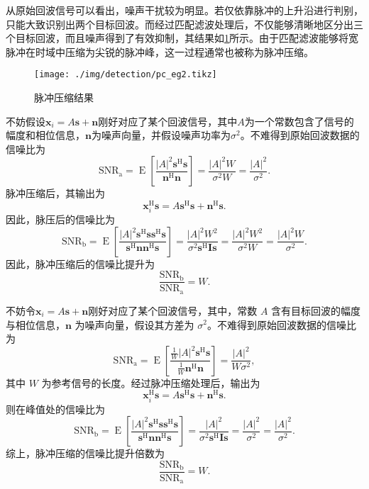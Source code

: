 \begin{solution}
    从原始回波信号可以看出，噪声干扰较为明显。若仅依靠脉冲的上升沿进行判别，只能大致识别出两个目标回波。而经过匹配滤波处理后，不仅能够清晰地区分出三个目标回波，而且噪声得到了有效抑制，其结果如\cref{fig_pc_eg2}所示。由于匹配滤波能够将宽脉冲在时域中压缩为尖锐的脉冲峰，这一过程通常也被称为脉冲压缩。
    \begin{figure}[htb!]
        \centering
        \texttt{[image: ./img/detection/pc\_eg2.tikz]}
        \caption{脉冲压缩结果}
        \label{fig_pc_eg2}
    \end{figure}
    不妨假设\( \bm{x}_i = A \bm{s} + \bm{n} \)刚好对应了某个回波信号，其中\( A \)为一个常数包含了信号的幅度和相位信息，\( \bm{n} \)为噪声向量，并假设噪声功率为\( \sigma^2 \)。不难得到原始回波数据的信噪比为
    \[
        \mathrm{SNR}_{\mathrm{a}} = \operatorname{E}\left[ \frac{|A|^2 \bm{s}^{\mathrm{H}} \bm{s}}{\bm{n}^{\mathrm{H}} \bm{n}} \right] = \frac{|A|^2 W}{\sigma^2 W} = \frac{|A|^2}{\sigma^2}.
    \]
    脉冲压缩后，其输出为
    \[
        \bm{x}_i^{\mathrm{H}} \bm{s} = A \bm{s}^{\mathrm{H}} \bm{s} + \bm{n}^{\mathrm{H}} \bm{s}.
    \]
    因此，脉压后的信噪比为
    \[
        \mathrm{SNR}_{\mathrm{b}} = \operatorname{E}\left[\frac{|A|^2 \bm{s}^{\mathrm{H}} \bm{s} \bm{s}^{\mathrm{H}} \bm{s} }{  \bm{s}^{\mathrm{H}} \bm{n}  \bm{n}^{\mathrm{H}} \bm{s} } \right] = \frac{|A|^2 W^2}{\sigma^2 \bm{s}^{\mathrm{H}}  \mathbf{I} \bm{s} } = \frac{|A|^2 W^2}{\sigma^2 W} = \frac{|A|^2 W}{\sigma^2}.
    \]
    因此，脉冲压缩后的信噪比提升为
    \[
        \frac{\mathrm{SNR}_{\mathrm{b}}}{\mathrm{SNR}_{\mathrm{a}}} = W.
    \]

    不妨令\( \bm{x}_i = A \bm{s} + \bm{n} \)刚好对应了某个回波信号，其中，常数 \(A\) 含有目标回波的幅度与相位信息，\(\bm{n}\) 为噪声向量，假设其方差为 \(\sigma^2\)。不难得到原始回波数据的信噪比为
    \[
        \mathrm{SNR}_{\mathrm{a}} = \operatorname{E}\left[ \frac{\frac{1}{W}|A|^2 \bm{s}^{\mathrm{H}} \bm{s}}{\frac{1}{W}\bm{n}^{\mathrm{H}} \bm{n}} \right] = \frac{|A|^2}{W\sigma^2},
    \]
    其中 \(W \) 为参考信号的长度。经过脉冲压缩处理后，输出为
    \[
        \bm{x}_i^{\mathrm{H}} \bm{s} = A \bm{s}^{\mathrm{H}} \bm{s} + \bm{n}^{\mathrm{H}} \bm{s}.
    \]
    则在峰值处的信噪比为
    \[
        \mathrm{SNR}_{\mathrm{b}} = \operatorname{E}\left[\frac{|A|^2 \bm{s}^{\mathrm{H}} \bm{s} \bm{s}^{\mathrm{H}} \bm{s} }{  \bm{s}^{\mathrm{H}} \bm{n}  \bm{n}^{\mathrm{H}} \bm{s} } \right] = \frac{|A|^2}{\sigma^2 \bm{s}^{\mathrm{H}}  \mathbf{I} \bm{s} } = \frac{|A|^2}{\sigma^2} = \frac{|A|^2}{\sigma^2}.
    \]
    综上，脉冲压缩的信噪比提升倍数为
    \[
        \frac{\mathrm{SNR}_{\mathrm{b}}}{\mathrm{SNR}_{\mathrm{a}}} = W.
    \]
\end{solution}

